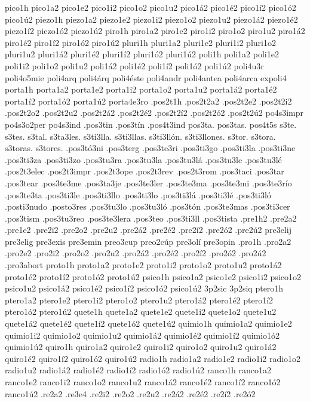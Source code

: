 {pico1h
pico1a2 pico1e2 pico1i2 pico1o2 pico1u2
pico1á2 pico1é2 pico1í2 pico1ó2 pico1ú2
piezo1h
piezo1a2 piezo1e2 piezo1i2 piezo1o2 piezo1u2
piezo1á2 piezo1é2 piezo1í2 piezo1ó2 piezo1ú2
piro1h
piro1a2 piro1e2 piro1i2 piro1o2 piro1u2
piro1á2 piro1é2 piro1í2 piro1ó2 piro1ú2
pluri1h
pluri1a2 pluri1e2 pluri1i2 pluri1o2 pluri1u2
pluri1á2 pluri1é2 pluri1í2 pluri1ó2 pluri1ú2
poli1h
poli1a2 poli1e2 poli1i2 poli1o2 poli1u2
poli1á2 poli1é2 poli1í2 poli1ó2 poli1ú2
poli4u3r
poli4o5mie
poli4arq
poli4árq
poli4éste
poli4andr
poli4antea
poli4arca
expoli4
porta1h
porta1a2 porta1e2 porta1i2 porta1o2 porta1u2
porta1á2 porta1é2 porta1í2 porta1ó2 porta1ú2
porta4e3ro
.pos2t1h
.pos2t2a2 .pos2t2e2 .pos2t2i2 .pos2t2o2 .pos2t2u2
.pos2t2á2 .pos2t2é2 .pos2t2í2 .pos2t2ó2 .pos2t2ú2
po4s3impr
po4s3o2per
po4s3ind
.pos3tin
.pos3tín
.pos4t3ind
pos3ta.
pos3tas.
pos4t5s
s3te.
s3tes.
s3tal.
s3ta3les.
s3ti3lla.
s3ti3llas.
s3ti3llón.
s3ti3llones.
s3tor.
s3tora.
s3toras.
s3tores.
.pos3tó3ni
.pos3terg
.pos3te3ri
.pos3ti3go
.pos3ti3la
.pos3ti3ne
.pos3ti3za
.pos3ti3zo
.pos3tu3ra
.pos3tu3la
.pos3tu3lá
.pos3tu3le
.pos3tu3lé
.pos2t3elec
.pos2t3impr
.pos2t3ope
.pos2t3rev
.pos2t3rom
.pos3taci
.pos3tar
.pos3tear
.pos3te3me
.pos3ta3je
.pos3te3ler
.pos3te3ma
.pos3te3mi
.pos3te3río
.pos3te3ta
.pos3ti3le
.pos3ti3llo
.pos3ti3lo
.pos3ti3lá
.pos3ti3lé
.pos3ti3ló
.posti3nudo
.posto3res
.pos3tu3lo
.pos3tu3ló
.pos3tón
.pos3te3mas
.pos3ti3cer
.pos3tism
.pos3tu3reo
.pos3te3lera
.pos3teo
.pos3ti3ll
.pos3tista
.pre1h2
.pre2a2
.pre1e2
.pre2i2
.pre2o2
.pre2u2
.pre2á2
.pre2é2
.pre2í2
.pre2ó2
.pre2ú2
pre3elij
pre3elig
pre3exis
pre3emin
preo3cup
preo2cúp
pre3olí
pre3opin
.pro1h
.pro2a2 .pro2e2 .pro2i2 .pro2o2 .pro2u2
.pro2á2 .pro2é2 .pro2í2 .pro2ó2 .pro2ú2
.pro3abort
proto1h
proto1a2 proto1e2 proto1i2 proto1o2 proto1u2
proto1á2 proto1é2 proto1í2 proto1ó2 proto1ú2
psico1h
psico1a2 psico1e2 psico1i2 psico1o2 psico1u2
psico1á2 psico1é2 psico1í2 psico1ó2 psico1ú2
3p2sic
3p2siq
ptero1h
ptero1a2 ptero1e2 ptero1i2 ptero1o2 ptero1u2
ptero1á2 ptero1é2 ptero1í2 ptero1ó2 ptero1ú2
quete1h
quete1a2 quete1e2 quete1i2 quete1o2 quete1u2
quete1á2 quete1é2 quete1í2 quete1ó2 quete1ú2
quimio1h
quimio1a2 quimio1e2 quimio1i2 quimio1o2 quimio1u2
quimio1á2 quimio1é2 quimio1í2 quimio1ó2 quimio1ú2
quiro1h
quiro1a2 quiro1e2 quiro1i2 quiro1o2 quiro1u2
quiro1á2 quiro1é2 quiro1í2 quiro1ó2 quiro1ú2
radio1h
radio1a2 radio1e2 radio1i2 radio1o2 radio1u2
radio1á2 radio1é2 radio1í2 radio1ó2 radio1ú2
ranco1h
ranco1a2 ranco1e2 ranco1i2 ranco1o2 ranco1u2
ranco1á2 ranco1é2 ranco1í2 ranco1ó2 ranco1ú2
.re2a2
.re3e4
.re2i2
.re2o2
.re2u2
.re2á2
.re2é2
.re2í2
.re2ó2
}
